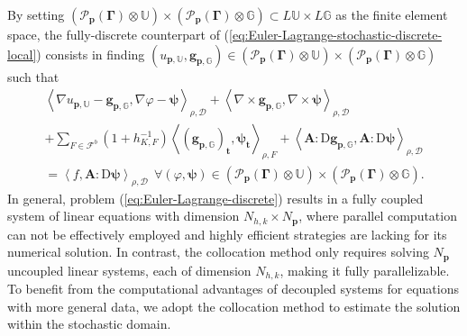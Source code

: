 \documentclass[final,onefignum,onetabnum]{mousaviart}
\begin{document}
	By setting $\left( \mathcal{P}_{\boldsymbol{p}}(\boldsymbol{\Gamma}) \otimes \mathbb{U} \right)   \times \left( \mathcal{P}_{\boldsymbol{p}}(\boldsymbol{\Gamma}) \otimes  \mathbb{G} \right) \subset L \mathbb{U} \times L \mathbb{G}$ as the finite element space, the fully-discrete counterpart of (\ref{eq:Euler-Lagrange-stochastic-discrete-local}) consists in finding $(u_{\boldsymbol{p},\mathbb{U}}, \boldsymbol{g}_{\boldsymbol{p},\mathbb{G}}) \in \left(  \mathcal{P}_{\boldsymbol{p}}(\boldsymbol{\Gamma}) \otimes \mathbb{U} \right)   \times \left( \mathcal{P}_{\boldsymbol{p}}(\boldsymbol{\Gamma}) \otimes \mathbb{G} \right) $ such that
	\begin{multline}
		\label{eq:Euler-Lagrange-discrete}
		\left\langle \nabla u_{\boldsymbol{p},\mathbb{U}} - \boldsymbol{g}_{\boldsymbol{p},\mathbb{G}}, \nabla\varphi - \boldsymbol{\psi} \right\rangle_{\rho,\mathcal{D}}  
		+
		\left\langle  \nabla \times \boldsymbol{g}_{\boldsymbol{p},\mathbb{G}}, \nabla \times \boldsymbol{\psi} \right\rangle_{\rho, \mathcal{D}} 
		\\
		+
		\sum_{F \in \mathcal{F}^b} \left( 1 + h_{K,F}^{-1}\right) \left\langle   \left( \boldsymbol{g}_{\boldsymbol{p},\mathbb{G}}\right) _{\boldsymbol{t}} , \boldsymbol{\psi}_{\boldsymbol{t}} \right\rangle _{\rho, F}
		+
		\left\langle  \boldsymbol{A}: \mathrm{D} \boldsymbol{g}_{\boldsymbol{p},\mathbb{G}}, \boldsymbol{A}: \mathrm{D} \boldsymbol{\psi} \right\rangle_{\rho, \mathcal{D}} 
		\\
		= 
		\left\langle  f, \boldsymbol{A}: \mathrm{D} \boldsymbol{\psi} \right\rangle_{\rho, \mathcal{D}} 
		~~
		\forall (\varphi, \boldsymbol{\psi}) \in 
		\left( \mathcal{P}_{\boldsymbol{p}}(\boldsymbol{\Gamma}) \otimes \mathbb{U} \right)  \times \left(  \mathcal{P}_{\boldsymbol{p}}(\boldsymbol{\Gamma}) \otimes \mathbb{G}\right)  .
	\end{multline}
	In general, problem (\ref{eq:Euler-Lagrange-discrete}) results in a fully coupled system of linear equations with dimension $N_{h,k} \times N_{\boldsymbol{p}}$, where parallel computation can not be effectively employed and highly efficient strategies are lacking for its numerical solution.
	In contrast, the collocation method only requires solving $N_{\boldsymbol{p}}$ uncoupled linear systems, each of dimension $N_{h,k}$, making it fully parallelizable.
	To benefit from the computational advantages of decoupled systems for equations with more general data, we adopt the collocation method to estimate the solution within the stochastic domain.	
	
\end{document}
